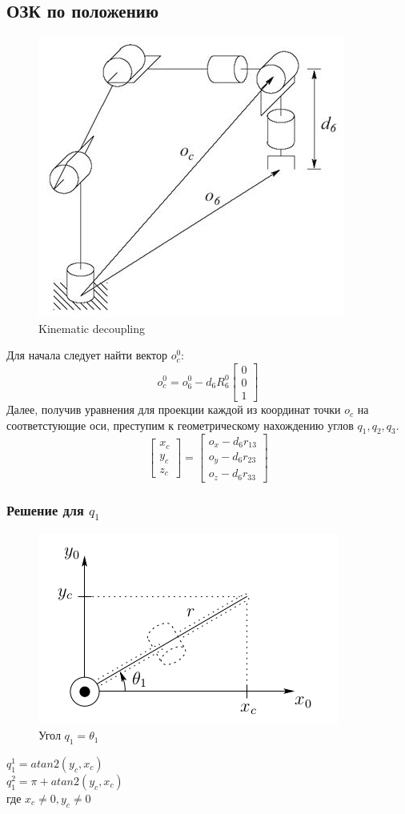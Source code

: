 \documentclass[a4paper,14pt]{extreport}
\begin{document}
	\subsection{ОЗК по положению}
	\begin{figure}[H]
		\center\includegraphics[width=0.3\linewidth]{decoupling.png}
		\caption{Kinematic decoupling}
		\label{fig:scr1}
	\end{figure}
	Для начала следует найти вектор $o^0_c$:
	\begin{equation}
		o^0_c = o^0_6 - d_6R^0_6 
		\begin{bmatrix}
			0\\
			0\\
			1
		\end{bmatrix}
	\end{equation}
	Далее, получив уравнения для проекции каждой из координат точки $o_c$ на соответстующие оси, преступим к геометрическому нахождению углов $q_1, q_2, q_3$.
	\begin{equation}
		\begin{bmatrix}
			x_c\\
			y_c\\
			z_c			
		\end{bmatrix}
		=		
		\begin{bmatrix}
			o_x - d_6r_{13}\\		
			o_y - d_6r_{23}\\
			o_z - d_6r_{33}						
		\end{bmatrix}
	\end{equation}
	
	\subsubsection{Решение для $q_1$}
	\begin{figure}[H]
		\center\includegraphics[width=0.3\linewidth]{position_q1.png}
		\caption{Угол $q_1 = \theta_1$}
		\label{fig:scr2}
	\end{figure}
	\begin{center}
		$q_1^1 = atan2(y_c, x_c)$\\
		$q_1^2 = \pi  + atan2(y_c, x_c)$\\
		где $x_c \neq 0, y_c \neq 0$	
	\end{center}	
	
\end{document}
